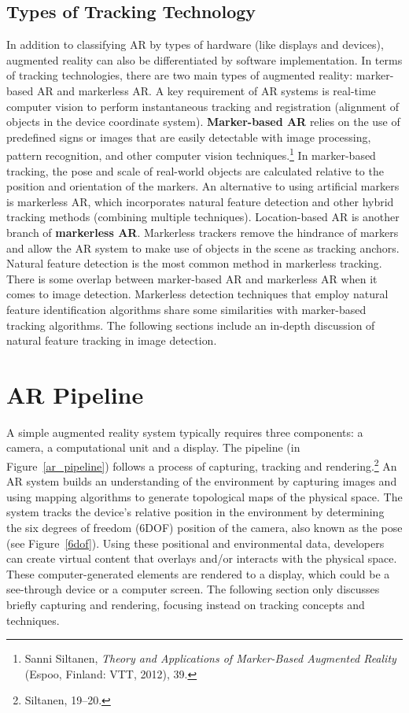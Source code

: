 \subsection{Types of Tracking Technology}\label{trackingtech}
In addition to classifying AR by types of hardware (like displays and devices), augmented reality can also be differentiated by software implementation. In terms of tracking technologies, there are two main types of augmented reality: marker-based AR and markerless AR. A key requirement of AR systems is real-time computer vision to perform instantaneous tracking and registration (alignment of objects in the device coordinate system). \textbf{Marker-based AR} relies on the use of predefined signs or images that are easily detectable with image processing, pattern recognition, and other computer vision techniques.\footnote{Sanni Siltanen, \textit{Theory and Applications of Marker-Based Augmented Reality} (Espoo, Finland: VTT, 2012), 39.} In marker-based tracking, the pose and scale of real-world objects are calculated relative to the position and orientation of the markers. An alternative to using artificial markers is markerless AR, which incorporates natural feature detection and other hybrid tracking methods (combining multiple techniques). Location-based AR is another branch of \textbf{markerless AR}. Markerless trackers remove the hindrance of markers and allow the AR system to make use of objects in the scene as tracking anchors. Natural feature detection is the most common method in markerless tracking. There is some overlap between marker-based AR and markerless AR when it comes to image detection. Markerless detection techniques that employ natural feature identification algorithms share some similarities with marker-based tracking algorithms. The following sections include an in-depth discussion of natural feature tracking in image detection.

\section{AR Pipeline}
A simple augmented reality system typically requires three components: a camera, a computational unit and a display. The pipeline (in Figure~\ref{ar_pipeline}) follows a process of capturing, tracking and rendering.\footnote{Siltanen, 19–20.} An AR system builds an understanding of the environment by capturing images and using mapping algorithms to generate topological maps of the physical space. The system tracks the device’s relative position in the environment by determining the six degrees of freedom (6DOF) position of the camera, also known as the pose (see Figure~\ref{6dof}). Using these positional and environmental data, developers can create virtual content that overlays and/or interacts with the physical space. These computer-generated elements are rendered to a display, which could be a see-through device or a computer screen. The following section only discusses briefly capturing and rendering, focusing instead on tracking concepts and techniques.


